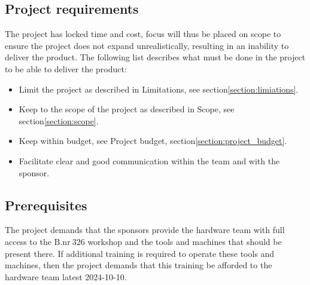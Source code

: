 

\subsection{Project requirements}

The project has locked time and cost, focus will thus be placed on scope to ensure the project does not expand unrealistically, resulting in an inability to deliver the product. The following list describes what must be done in the project to be able to deliver the product:
\begin{itemize}
    \item Limit the project as described in Limitations, see section\:\ref{section:limiations}.
    \item Keep to the scope of the project as described in Scope, see section\:\ref{section:scope}. 
    \item Keep within budget, see Project budget, section\:\ref{section:project_budget}.
    \item Facilitate clear and good communication within the team and with the sponsor.
\end{itemize}



\subsection{Prerequisites}

The project demands that the sponsors provide the hardware team with full access to the $\text{B.nr}\:326$ workshop and the tools and machines that should be present there. If additional training is required to operate these tools and machines, then the project demands that this training be afforded to the hardware team latest 2024-10-10.



